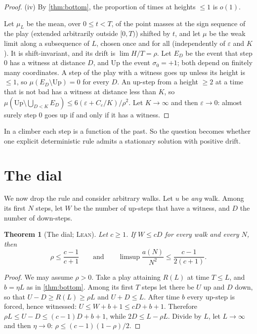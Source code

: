 \documentclass[11pt]{amsart}
\newtheorem{theorem}{Theorem}[section]
\theoremstyle{definition}
\newcommand{\eps}{\varepsilon}
\newcommand{\LEAN}{\textsc{Lean}}
\begin{document}
\begin{proof}
(iv) By \cref{thm:bottom}, the proportion of times at heights $\le1$ is $o(1)$.

Let $\mu_L$ be the mean, over $0\le t<T$, of the point masses at the sign sequence of the play (extended arbitrarily outside $[0,T)$)
shifted by $t$, and let $\mu$ be the weak limit along a subsequence of $L$, chosen once and for all (independently of $\eps$
and $K$). It is shift-invariant, and its drift is $\lim H/T=\rho$. Let
$E_D$ be the event that step $0$ has a witness at distance $D$, and $\mathrm{Up}$ the event $\sigma_0=+1$; both depend on
finitely many coordinates. A step of the play with a witness goes up unless its height is $\le1$, so
$\mu(E_D\setminus\mathrm{Up})=0$ for every $D$. An up-step from a height $\ge2$ at a time that is not bad has a witness at distance less
than $K$, so $\mu(\mathrm{Up}\setminus\bigcup_{D<K}E_D)\le6(\eps+C_\eps/K)/\rho^2$. Let $K\to\infty$ and then $\eps\to0$: almost surely step $0$ goes up
if and only if it has a witness.
\end{proof}

In a climber each step is a function of the past. So the question becomes whether one explicit deterministic rule admits a
stationary solution with positive drift.

\section{The dial}\label{sec:dial}

We now drop the rule and consider arbitrary walks. Let $u$ be \emph{any} walk. Among its first $N$ steps, let $W$ be the number of up-steps that have a witness, and $D$ the number of down-steps.

\begin{theorem}[The dial; \LEAN]\label{thm:dial}
Let $c\ge1$. If $W\le cD$ for every walk and every $N$, then
\[
 \rho\le\frac{c-1}{c+1}\qquad\text{and}\qquad \limsup\frac{a(N)}{N^2}\le\frac{c-1}{2(c+1)} .
\]
\end{theorem}

\begin{proof}
We may assume $\rho>0$. Take a play attaining $R(L)$ at time $T\le L$, and $b=\eta L$ as in \cref{thm:bottom}. Among its
first $T$ steps let there be $U$ up and $D$ down, so that $U-D\ge R(L)\ge\rho L$ and $U+D\le L$. After time $b$ every up-step is forced,
hence witnessed: $U\le W+b+1\le cD+b+1$. Therefore $\rho L\le U-D\le(c-1)D+b+1$, while $2D\le L-\rho L$. Divide by $L$, let
$L\to\infty$ and then $\eta\to0$: $\rho\le(c-1)(1-\rho)/2$.
\end{proof}
\end{document}
